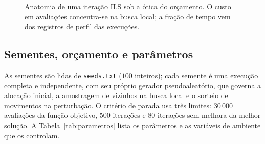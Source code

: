\documentclass[11pt,a4paper]{article}
\newcommand{\code}[1]{\texttt{#1}}
\begin{document}
\begin{figure}[htbp]
\centering
{}
\caption{Anatomia de uma iteração ILS sob a ótica do orçamento. O custo em avaliações concentra-se na busca local; a fração de tempo vem dos registros de perfil das execuções.}
\label{fig:ils-anatomia}
\end{figure}

\subsection{Sementes, orçamento e parâmetros}

As sementes são lidas de \code{seeds.txt} ($100$ inteiros); cada semente é uma execução completa e independente, com seu próprio gerador pseudoaleatório, que governa a alocação inicial, a amostragem de vizinhos na busca local e o sorteio de movimentos na perturbação. O critério de parada usa três limites: $30\,000$ avaliações da função objetivo, $500$ iterações e $80$ iterações sem melhora da melhor solução. A Tabela~\ref{tab:parametros} lista os parâmetros e as variáveis de ambiente que os controlam.
\end{document}
